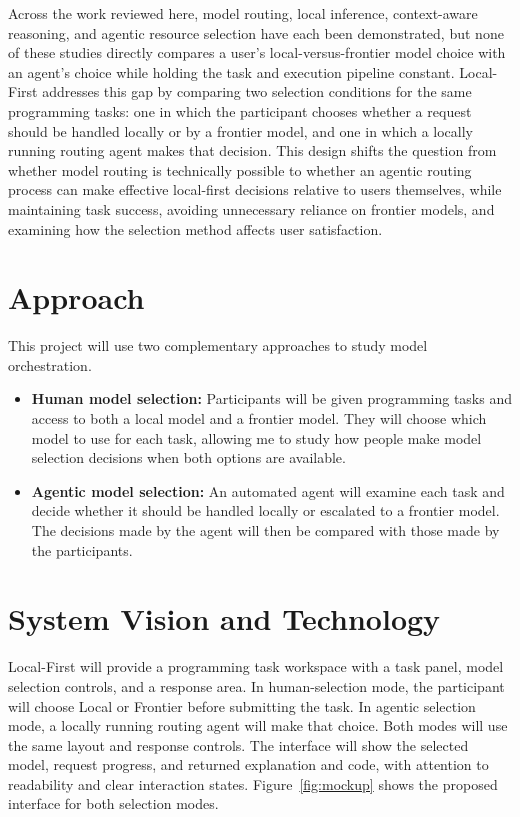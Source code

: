 \documentclass[sigconf,nonacm]{acmart}
\begin{document}
Across the work reviewed here, model routing, local inference, context-aware reasoning, and agentic resource selection have each been demonstrated, but none of these studies directly compares a user's local-versus-frontier model choice with an agent's choice while holding the task and execution pipeline constant. Local-First addresses this gap by comparing two selection conditions for the same programming tasks: one in which the participant chooses whether a request should be handled locally or by a frontier model, and one in which a locally running routing agent makes that decision. This design shifts the question from whether model routing is technically possible to whether an agentic routing process can make effective local-first decisions relative to users themselves, while maintaining task success, avoiding unnecessary reliance on frontier models, and examining how the selection method affects user satisfaction.

\section{Approach}
This project will use two complementary approaches to study model orchestration. 
\begin{itemize}
\item \textbf{Human model selection:} Participants will be given programming tasks and access to both a local model and a frontier model. They will choose which model to use for each task, allowing me to study how people make model selection decisions when both options are available.
\item \textbf{Agentic model selection:} An automated agent will examine each task and decide whether it should be handled locally or escalated to a frontier model. The decisions made by the agent will then be compared with those made by the participants.\end{itemize}

\section{System Vision and Technology}
\noindent
Local-First will provide a programming task workspace with a task panel, model selection controls, and a response area. In human-selection mode, the participant will choose Local or Frontier before submitting the task. In agentic selection mode, a locally running routing agent will make that choice. Both modes will use the same layout and response controls. The interface will show the selected model, request progress, and returned explanation and code, with attention to readability and clear interaction states. Figure~\ref{fig:mockup} shows the proposed interface for both selection modes.
\end{document}
